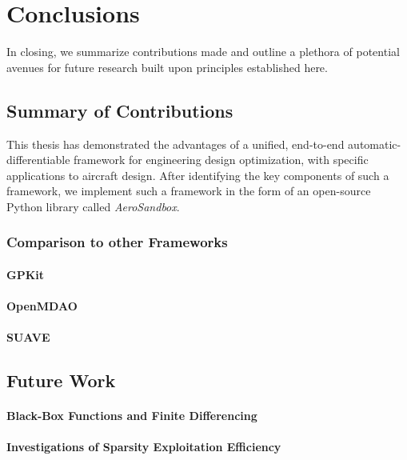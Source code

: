 \chapter{Conclusions}

In closing, we summarize contributions made and outline a plethora of potential avenues for future research built upon principles established here.

\section{Summary of Contributions}

This thesis has demonstrated the advantages of a unified, end-to-end automatic-differentiable framework for engineering design optimization, with specific applications to aircraft design. After identifying the key components of such a framework, we implement such a framework in the form of an open-source Python library called \textit{AeroSandbox}.

\subsection{Comparison to other Frameworks}
\label{sect:compare}

\subsubsection{GPKit}

\subsubsection{OpenMDAO}

\subsubsection{SUAVE}

\section{Future Work}

\subsubsection{Black-Box Functions and Finite Differencing}
\label{sect:future-work-black-box}

\subsubsection{Investigations of Sparsity Exploitation Efficiency}

